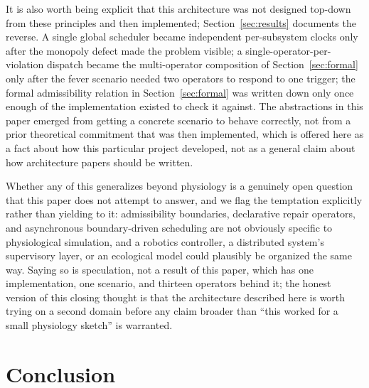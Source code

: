 \documentclass[11pt]{article}
\begin{document}
It is also worth being explicit that this architecture was not designed top-down from these principles and then implemented; Section~\ref{sec:results} documents the reverse. A single global scheduler became independent per-subsystem clocks only after the monopoly defect made the problem visible; a single-operator-per-violation dispatch became the multi-operator composition of Section~\ref{sec:formal} only after the fever scenario needed two operators to respond to one trigger; the formal admissibility relation in Section~\ref{sec:formal} was written down only once enough of the implementation existed to check it against. The abstractions in this paper emerged from getting a concrete scenario to behave correctly, not from a prior theoretical commitment that was then implemented, which is offered here as a fact about how this particular project developed, not as a general claim about how architecture papers should be written.

Whether any of this generalizes beyond physiology is a genuinely open question that this paper does not attempt to answer, and we flag the temptation explicitly rather than yielding to it: admissibility boundaries, declarative repair operators, and asynchronous boundary-driven scheduling are not obviously specific to physiological simulation, and a robotics controller, a distributed system's supervisory layer, or an ecological model could plausibly be organized the same way. Saying so is speculation, not a result of this paper, which has one implementation, one scenario, and thirteen operators behind it; the honest version of this closing thought is that the architecture described here is worth trying on a second domain before any claim broader than ``this worked for a small physiology sketch'' is warranted.

\section{Conclusion}
\label{sec:conclusion}
\end{document}
